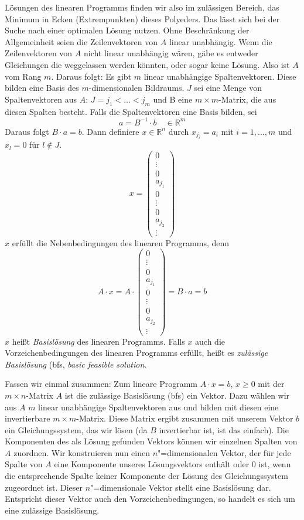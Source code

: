 Lösungen des linearen Programms finden wir also im zulässigen Bereich, das Minimum in Ecken (Extrempunkten) dieses Polyeders. Das lässt sich bei der Suche nach einer optimalen Lösung nutzen. 
Ohne Beschränkung der Allgemeinheit seien die Zeilenvektoren von $A$ linear unabhängig. Wenn die Zeilenvektoren von $A$ nicht linear unabhängig wären, gäbe es entweder Gleichungen die weggelassen werden könnten, oder sogar keine Lösung. Also ist $A$ vom Rang $m$. Daraus folgt: Es gibt $m$ linear unabhängige Spaltenvektoren. Diese bilden eine Basis des $m$-dimensionalen Bildraums. $J$ sei eine Menge von Spaltenvektoren aus $A$: $J = j_1 < \ldots < j_m$ und B eine $m \times m$-Matrix, die aus diesen Spalten besteht. Falls die Spaltenvektoren eine Basis bilden, sei
\[ a = B^{-1} \cdot b \quad \in \mathbb{R}^m \]
Daraus folgt $B \cdot a = b$. Dann definiere $x \in \mathbb{R}^n$ durch $x_{j_i} = a_i$ mit $ i=1, \ldots, m$ und $x_l = 0$ für $l \notin J$.
\[ x = \begin{pmatrix}0 \\ \vdots \\ 0 \\ a_{j_1} \\ 0 \\ \vdots \\ 0 \\ a_{j_2} \\ \vdots \end{pmatrix} \]
$x$ erfüllt die Nebenbedingungen des linearen Programms, denn
\[ A \cdot x = A \cdot \begin{pmatrix} 0 \\ \vdots \\ 0 \\ a_{j_1} \\ 0 \\ \vdots \\ 0 \\ a_{j_2} \\ \vdots \end{pmatrix} = B \cdot a = b\]
$x$ heißt \textit{Basislösung} des linearen Programms.
Falls $x$ auch die Vorzeichenbedingungen des linearen Programms erfüllt, heißt es \textit{zulässige Basislösung} (bfs, \textit{basic feasible solution}.

Fassen wir einmal zusammen: Zum lineare Programm $ A \cdot x = b$, $x \ge 0$ mit der $m \times n$-Matrix $A$ ist die zulässige Basislösung (bfs) ein Vektor. Dazu wählen wir aus $A$ $m$ linear unabhängige Spaltenvektoren aus und bilden mit diesen eine invertierbare $m \times m$-Matrix. Diese Matrix ergibt zusammen mit unserem Vektor $b$ ein Gleichungssystem, das wir lösen (da $B$ invertierbar ist, ist das einfach). Die Komponenten des als Lösung gefunden Vektors können wir einzelnen Spalten von $A$ zuordnen. Wir konstruieren nun einen $n$"=dimensionalen Vektor, der für jede Spalte von $A$ eine Komponente unseres Lösungsvektors enthält oder $0$ ist, wenn die entsprechende Spalte keiner Komponente der Lösung des Gleichungssystem zugeordnet ist. Dieser $n$"=dimensionale Vektor stellt eine Basislösung dar. Entspricht dieser Vektor auch den Vorzeichenbedingungen, so handelt es sich um eine zulässige Basislösung.

